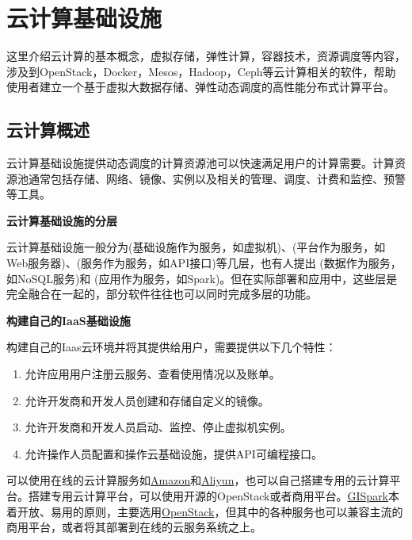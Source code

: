 \documentclass[letterpaper,10pt,english]{sphinxmanual}
\begin{document}
\section{云计算基础设施}
\label{gispark_cloud:_u4e91_u8ba1_u7b97_u57fa_u7840_u8bbe_u65bd}\label{gispark_cloud::doc}
这里介绍云计算的基本概念，虚拟存储，弹性计算，容器技术，资源调度等内容，涉及到OpenStack，Docker，Mesos，Hadoop，Ceph等云计算相关的软件，帮助使用者建立一个基于虚拟大数据存储、弹性动态调度的高性能分布式计算平台。


\subsection{云计算概述}
\label{gispark_cloud:_u4e91_u8ba1_u7b97_u6982_u8ff0}
云计算基础设施提供动态调度的计算资源池可以快速满足用户的计算需要。计算资源池通常包括存储、网络、镜像、实例以及相关的管理、调度、计费和监控、预警等工具。

\textbf{云计算基础设施的分层}

云计算基础设施一般分为(基础设施作为服务，如虚拟机)、(平台作为服务，如Web服务器)、(服务作为服务，如API接口)等几层，也有人提出
(数据作为服务，如NoSQL服务)和
(应用作为服务，如Spark)。但在实际部署和应用中，这些层是完全融合在一起的，部分软件往往也可以同时完成多层的功能。

\textbf{构建自己的IaaS基础设施}

构建自己的Iaas云环境并将其提供给用户，需要提供以下几个特性：
\begin{enumerate}
\item {} 
允许应用用户注册云服务、查看使用情况以及账单。

\item {} 
允许开发商和开发人员创建和存储自定义的镜像。

\item {} 
允许开发商和开发人员启动、监控、停止虚拟机实例。

\item {} 
允许操作人员配置和操作云基础设施，提供API可编程接口。

\end{enumerate}

可以使用在线的云计算服务如\href{http://www.amazon.com}{Amazon}和\href{http://www.aliyun.com}{Aliyun}，也可以自己搭建专用的云计算平台。搭建专用云计算平台，可以使用开源的OpenStack或者商用平台。\href{http://www.gispark.org}{GISpark}本着开放、易用的原则，主要选用\href{http://www.openstack.org}{OpenStack}，但其中的各种服务也可以兼容主流的商用平台，或者将其部署到在线的云服务系统之上。
\end{document}
